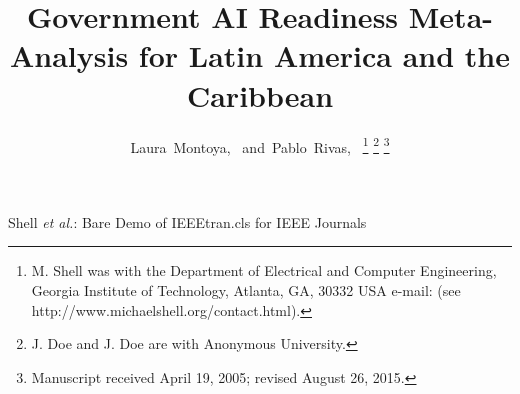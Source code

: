 \documentclass[journal]{IEEEtran}
\begin{document}
%
\title{Government AI Readiness Meta-Analysis for Latin America and the Caribbean}
%
%
%

\author{Laura~Montoya,~
        and~Pablo~Rivas,~%
\thanks{M. Shell was with the Department
of Electrical and Computer Engineering, Georgia Institute of Technology, Atlanta,
GA, 30332 USA e-mail: (see http://www.michaelshell.org/contact.html).}%
\thanks{J. Doe and J. Doe are with Anonymous University.}%
\thanks{Manuscript received April 19, 2005; revised August 26, 2015.}}

% 
%



%
{Shell \MakeLowercase{\textit{et al.}}: Bare Demo of IEEEtran.cls for IEEE Journals}
% 
\end{document}
